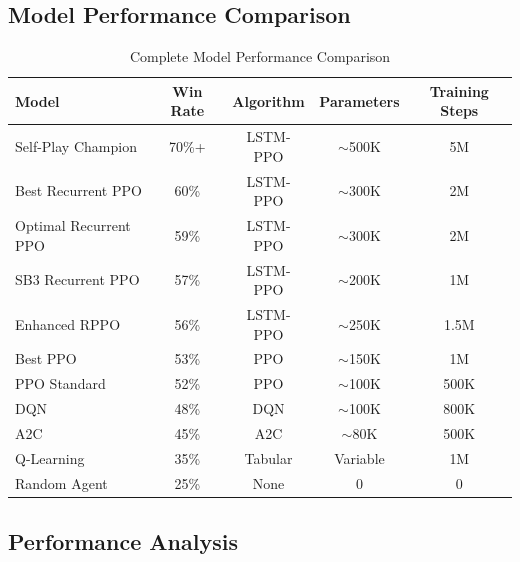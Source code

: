 \documentclass[12pt,a4paper]{article}
\begin{document}
\subsection{Model Performance Comparison}
\begin{table}[H]
\centering
\begin{tabular}{lcccc}
\toprule
\textbf{Model} & \textbf{Win Rate} & \textbf{Algorithm} & \textbf{Parameters} & \textbf{Training Steps} \\
\midrule
\rowcolor{unoGreen!20} Self-Play Champion & 70\%+ & LSTM-PPO & $\sim$500K & 5M \\
\rowcolor{unoYellow!20} Best Recurrent PPO & 60\% & LSTM-PPO & $\sim$300K & 2M \\
Optimal Recurrent PPO & 59\% & LSTM-PPO & $\sim$300K & 2M \\
SB3 Recurrent PPO & 57\% & LSTM-PPO & $\sim$200K & 1M \\
Enhanced RPPO & 56\% & LSTM-PPO & $\sim$250K & 1.5M \\
Best PPO & 53\% & PPO & $\sim$150K & 1M \\
PPO Standard & 52\% & PPO & $\sim$100K & 500K \\
DQN & 48\% & DQN & $\sim$100K & 800K \\
A2C & 45\% & A2C & $\sim$80K & 500K \\
Q-Learning & 35\% & Tabular & Variable & 1M \\
\rowcolor{unoRed!10} Random Agent & 25\% & None & 0 & 0 \\
\bottomrule
\end{tabular}
\caption{Complete Model Performance Comparison}
\label{tab:model_perf}
\end{table}
\subsection{Performance Analysis}
\end{document}
